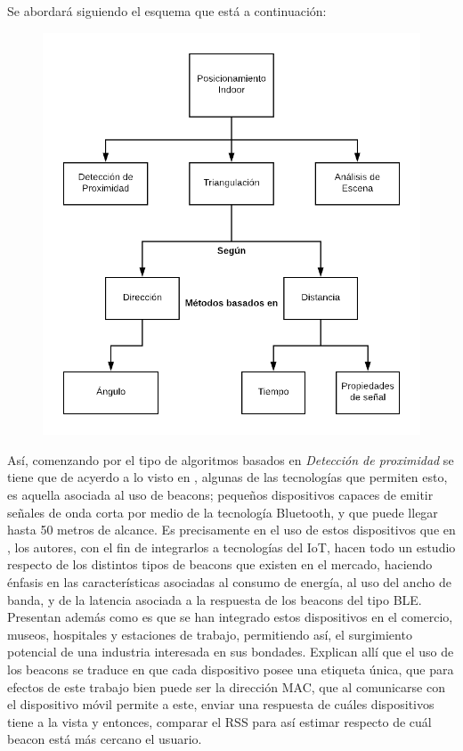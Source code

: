 Se abordará siguiendo el esquema que está a continuación:
\begin{figure}[h!]
    \centering
    \includegraphics[scale = 0.3]{./images/diagrama}
    \label{fig:diagrama}
\end{figure}

Así, comenzando por el tipo de algoritmos basados en \textit{Detección de proximidad} se tiene que de acyerdo a lo visto en \cite{6}, algunas de las tecnologías que permiten esto, es aquella asociada al uso de beacons; pequeños dispositivos capaces de emitir señales de onda corta por medio de la tecnología Bluetooth, y que puede llegar hasta 50 metros de alcance. Es precisamente en el uso de estos dispositivos que en \cite{20}, los autores, con el fin de integrarlos a tecnologías del IoT, hacen todo un estudio respecto de los distintos tipos de beacons que existen en el mercado, haciendo énfasis en las características asociadas al consumo de energía, al uso del ancho de banda, y de la latencia asociada a la respuesta de los beacons del tipo \ac{BLE}.\\

Presentan además como es que se han integrado estos dispositivos en el comercio, museos, hospitales y estaciones de trabajo, permitiendo así, el surgimiento potencial de una industria interesada en sus bondades. Explican allí que el uso de los beacons se traduce en que cada dispositivo posee una etiqueta única, que para efectos de este trabajo bien puede ser la dirección \ac{MAC}, que al comunicarse con el dispositivo móvil permite a este, enviar una respuesta de cuáles dispositivos tiene a la vista y entonces, comparar el \ac{RSS} para así estimar respecto de cuál beacon está más cercano el usuario.\\

